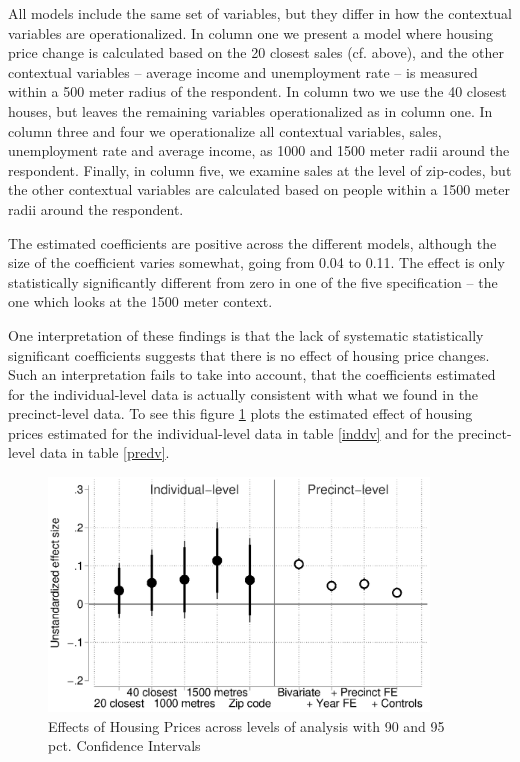 \documentclass[12pt,a4paper]{article}
\begin{document}
All models include the same set of variables, but they differ in how the contextual variables are operationalized. In column one we present a model where housing price change is calculated based on the 20 closest sales (cf. above), and the other contextual variables -- average income and unemployment rate -- is measured within a 500 meter radius of the respondent. In column two we use the 40 closest houses, but leaves the remaining variables operationalized as in column one. In column three and four we operationalize all contextual variables, sales, unemployment rate and average income, as 1000 and 1500 meter radii around the respondent. Finally, in column five, we examine sales at the level of zip-codes, but the other contextual variables are calculated based on people within a 1500 meter radii around the respondent.



The estimated coefficients are positive across the different models, although the size of the coefficient varies somewhat, going from 0.04 to 0.11. The effect is only statistically significantly different from zero in one of the five specification -- the one which looks at the 1500 meter context. 

One interpretation of these findings is that the lack of systematic statistically significant coefficients suggests that there is no effect of housing price changes. Such an interpretation fails to take into account, that the coefficients  estimated for the individual-level data is actually consistent with what we found in the precinct-level data. To see this figure \ref{comparison} plots the estimated effect of housing prices estimated for the individual-level data in table \ref{inddv}  and for the precinct-level data in table \ref{predv}.

\begin{figure}[htbp!]
	\includegraphics[width=0.9\textwidth]{../figures/comparison.eps}
	\centering
	\caption{Effects of Housing Prices across levels of analysis with 90  and 95 pct. Confidence Intervals}\label{comparison}
\end{figure}
\end{document}
